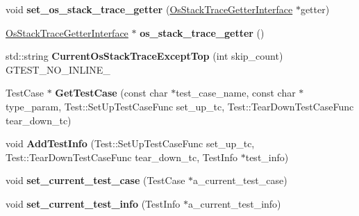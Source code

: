 \begin{DoxyCompactItemize}
\item 
\hypertarget{classtesting_1_1internal_1_1UnitTestImpl_a3306f7d2b19bca54b841006e4a2e0260}{void {\bfseries set\-\_\-os\-\_\-stack\-\_\-trace\-\_\-getter} (\hyperlink{classtesting_1_1internal_1_1OsStackTraceGetterInterface}{Os\-Stack\-Trace\-Getter\-Interface} $\ast$getter)}\label{classtesting_1_1internal_1_1UnitTestImpl_a3306f7d2b19bca54b841006e4a2e0260}

\item 
\hypertarget{classtesting_1_1internal_1_1UnitTestImpl_a71753679854f7fbba6c1568eb422fecb}{\hyperlink{classtesting_1_1internal_1_1OsStackTraceGetterInterface}{Os\-Stack\-Trace\-Getter\-Interface} $\ast$ {\bfseries os\-\_\-stack\-\_\-trace\-\_\-getter} ()}\label{classtesting_1_1internal_1_1UnitTestImpl_a71753679854f7fbba6c1568eb422fecb}

\item 
\hypertarget{classtesting_1_1internal_1_1UnitTestImpl_a61c0a51ac4e57d9f884f646ca6dd2210}{std\-::string {\bfseries Current\-Os\-Stack\-Trace\-Except\-Top} (int skip\-\_\-count) G\-T\-E\-S\-T\-\_\-\-N\-O\-\_\-\-I\-N\-L\-I\-N\-E\-\_\-}\label{classtesting_1_1internal_1_1UnitTestImpl_a61c0a51ac4e57d9f884f646ca6dd2210}

\item 
\hypertarget{classtesting_1_1internal_1_1UnitTestImpl_ac5684d824a59e963cb3274c79d0b6df3}{Test\-Case $\ast$ {\bfseries Get\-Test\-Case} (const char $\ast$test\-\_\-case\-\_\-name, const char $\ast$type\-\_\-param, Test\-::\-Set\-Up\-Test\-Case\-Func set\-\_\-up\-\_\-tc, Test\-::\-Tear\-Down\-Test\-Case\-Func tear\-\_\-down\-\_\-tc)}\label{classtesting_1_1internal_1_1UnitTestImpl_ac5684d824a59e963cb3274c79d0b6df3}

\item 
\hypertarget{classtesting_1_1internal_1_1UnitTestImpl_a1cc87dfc91377ebec4a3ff4192dfcba9}{void {\bfseries Add\-Test\-Info} (Test\-::\-Set\-Up\-Test\-Case\-Func set\-\_\-up\-\_\-tc, Test\-::\-Tear\-Down\-Test\-Case\-Func tear\-\_\-down\-\_\-tc, Test\-Info $\ast$test\-\_\-info)}\label{classtesting_1_1internal_1_1UnitTestImpl_a1cc87dfc91377ebec4a3ff4192dfcba9}

\item 
\hypertarget{classtesting_1_1internal_1_1UnitTestImpl_a7f0e79bdabd28819cc857e316a36a350}{void {\bfseries set\-\_\-current\-\_\-test\-\_\-case} (Test\-Case $\ast$a\-\_\-current\-\_\-test\-\_\-case)}\label{classtesting_1_1internal_1_1UnitTestImpl_a7f0e79bdabd28819cc857e316a36a350}

\item 
\hypertarget{classtesting_1_1internal_1_1UnitTestImpl_ab72211c99ce4427dfb472d6ecea62989}{void {\bfseries set\-\_\-current\-\_\-test\-\_\-info} (Test\-Info $\ast$a\-\_\-current\-\_\-test\-\_\-info)}\label{classtesting_1_1internal_1_1UnitTestImpl_ab72211c99ce4427dfb472d6ecea62989}


\end{DoxyCompactItemize}
